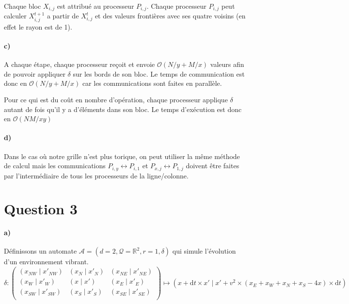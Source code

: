 \documentclass[a4paper]{article}
\begin{document}
  Chaque bloc $X_{i, j}$ est attribué au processeur $P_{i, j}$. Chaque processeur $P_{i, j}$ peut calculer $X^{t+1}_{i, j}$ a partir de $X^t_{i, j}$ et des valeurs frontières avec ses quatre voisins (en effet le rayon est de 1). 
  
  \paragraph{c)} A chaque étape, chaque processeur reçoit et envoie $\mathcal O(N/y + M/x)$ valeurs afin de pouvoir appliquer $\delta$ sur les bords de son bloc. Le temps de communication est donc en $\mathcal O(N/y + M/x)$ car les communications sont faites en parallèle.
  
  \bigskip Pour ce qui est du coût en nombre d'opération, chaque processeur applique $\delta$ autant de fois qu'il y a d'éléments dans son bloc. Le temps d'exécution est donc en $\mathcal O(NM / xy)$
  
  \paragraph{d)} Dans le cas où notre grille n'est plus torique, on peut utiliser la même méthode de calcul mais les communications $P_{i, y} \leftrightarrow P_{i, 1}$ et $P_{x, j} \leftrightarrow P_{1, j}$ doivent être faites par l'intermédiaire de tous les processeurs de la ligne/colonne.
  
  \section*{Question 3}
  
  \paragraph{a)}
  Définissons un automate $\mathcal A = (d = 2, \mathcal Q = \mathbb R^2, r = 1, \delta)$ qui simule l'évolution d'un environnement vibrant.
  \[\delta : \left(\begin{array}{ccc}
  (x_{NW} \;|\; x'_{NW}) & (x_{N} \;|\; x'_{N}) & (x_{NE} \;|\; x'_{NE}) \\
  (x_{W} \;|\; x'_{W}) & (x \;|\; x') & (x_{E} \;|\; x'_{E}) \\
  (x_{SW} \;|\; x'_{SW}) & (x_{S} \;|\; x'_{S}) & (x_{SE} \;|\; x'_{SE}) \\
  \end{array}\right) \mapsto (x + \mathrm dt \times x'\;|\; x' + v^2 \times (x_E + x_W + x_N + x_S - 4x) \times \mathrm dt)\]
  
\end{document}
